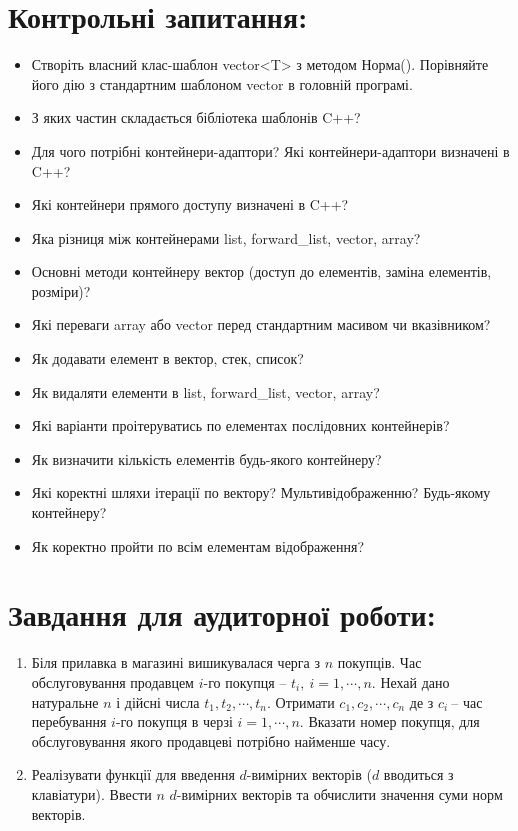 \documentclass[a5paper,titlepage,openany,twoside,
]
{book_unv}%
\begin{document}
\begin{enumerate}
\begin{enumerate}
\section{Контрольні запитання:}
\begin{itemize}
\item
  Створіть власний клас-шаблон vector\textless{}T\textgreater{} з
  методом Норма(). Порівняйте його дію з стандартним шаблоном vector в
  головній програмі.
\item
  З яких частин складається бібліотека шаблонів C++?
\item
  Для чого потрібні контейнери-адаптори? Які контейнери-адаптори
  визначені в C++?
\item
  Які контейнери прямого доступу визначені в C++?
\item
  Яка різниця між контейнерами list, forward\_list, vector, array?
\item
  Основні методи контейнеру вектор (доступ до елементів, заміна
  елементів, розміри)?
\item
  Які переваги array або vector перед стандартним масивом чи
  вказівником?
\item
  Як додавати елемент в вектор, стек, список?
\item
  Як видаляти елементи в list, forward\_list, vector, array?
\item
  Які варіанти проітеруватись по елементах послідовних контейнерів?

\item
Як визначити кількість елементів будь-якого контейнеру?
\item
Які коректні шляхи ітерації по вектору? Мультивідображенню? Будь-якому
контейнеру?
\item
Як коректно пройти по всім елементам відображення?

\end{itemize}

\section{Завдання для аудиторної роботи:}

\begin{enumerate}
\def\labelenumi{\arabic{enumi})}

\item
  Біля прилавка в магазині вишикувалася черга з $n$ покупців. Час
  обслуговування продавцем $i$-го покупця  --
  \(t_{i},\ i = 1,\cdots,n\). Нехай дано натуральне $n$ і дійсні числа
  \(t_{1},t_{2},\cdots,t_{n}\). Отримати \(c_{1},c_{2},\cdots,c_{n}\) де
  з \(c_{i}\ \)-- час перебування $i$-го покупця в черзі
  \(i = 1,\cdots,n\). Вказати номер покупця, для обслуговування якого
  продавцеві потрібно найменше часу.
\item
Реалізувати функції для введення $d$-вимірних векторів
($d$ вводиться з клавіатури). Ввести $n$ $d$-вимірних векторів
 та обчислити значення суми норм векторів.


\end{enumerate}
\end{enumerate}
\end{enumerate}
\end{document}
